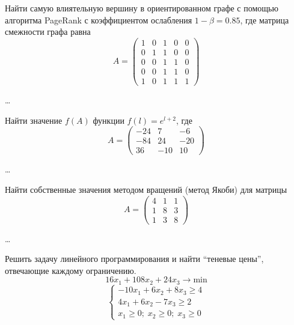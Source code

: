\begin{problem}
    Найти самую влиятельную вершину в ориентированном графе с помощью алгоритма
    PageRank с коэффициентом ослабления $1 - \beta = 0.85$, где матрица
    смежности графа равна
    \begin{equation*}
        A = \begin{pmatrix}
            1 & 0 & 1 & 0 & 0\\
            0 & 1 & 1 & 0 & 0\\
            0 & 0 & 1 & 1 & 0\\
            0 & 0 & 1 & 1 & 0\\
            1 & 0 & 1 & 1 & 1
        \end{pmatrix}
    \end{equation*}
\end{problem}

\ldots


\begin{problem}
    Найти значение $f(A)$ функции $f(l) = e^{l+2}$, где
    \begin{equation*}
        A = \begin{pmatrix}
            -24 & 7 & -6\\
            -84 & 24 & -20\\
            36 & -10 & 10
        \end{pmatrix}
    \end{equation*}
\end{problem}

\ldots


\begin{problem}
    Найти собственные значения методом вращений (метод Якоби) для матрицы
    \begin{equation*}
        A = \begin{pmatrix}
            4 & 1 & 1\\
            1 & 8 & 3\\
            1 & 3 & 8
        \end{pmatrix}
    \end{equation*}
\end{problem}

\ldots


\begin{problem}
    Решить задачу линейного программирования и найти ``теневые цены'', отвечающие
    каждому ограничению.
    \begin{equation*}
        16x_1 + 108x_2 + 24x_3 \to \text{min}
    \end{equation*}
    \begin{equation*}
        \begin{cases}
            -10x_1 + 6x_2 + 8x_3 \geq 4\\
            4x_1 + 6x_2 - 7x_3 \geq 2\\
            x_1 \geq 0; \; x_2 \geq 0; \; x_3 \geq 0
        \end{cases}
    \end{equation*}
\end{problem}


